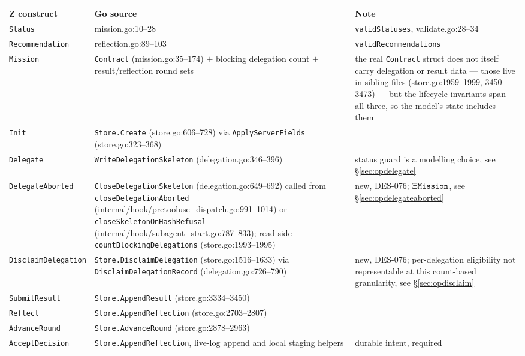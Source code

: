 \documentclass[a4paper,10pt,fleqn]{article}
\newcommand{\field}[1]{\ifmmode\texttt{#1}\else\texorpdfstring{\breakfield{#1}}{#1}\fi}
\begin{document}
\begin{longtable}{@{}>{\raggedright\arraybackslash}p{}>{\raggedright\arraybackslash}p{}>{\raggedright\arraybackslash}p{}@{}}
\toprule
\textbf{Z construct} & \textbf{Go source} & \textbf{Note} \\
\midrule
\endhead
\bottomrule
\endfoot
\field{Status} & mission.go:10--28 & \field{validStatuses},
  validate.go:28--34 \\
\field{Recommendation} & reflection.go:89--103 &
  \field{validRecommendations} \\
\field{Mission} & \field{Contract} (mission.go:35--174) $+$
  blocking delegation count $+$ result/reflection round sets & the
  real \field{Contract} struct does not itself carry delegation or
  result data --- those live in sibling files (store.go:1959--1999,
  3450--3473) --- but the lifecycle invariants span all three, so the
  model's state includes them \\
\field{Init} & \field{Store.Create}
  (store.go:606--728) via \field{ApplyServerFields}
  (store.go:323--368) & \\
\field{Delegate} & \field{WriteDelegationSkeleton}
  (delegation.go:346--396) & status guard is a modelling choice, see
  \S\ref{sec:opdelegate} \\
\field{DelegateAborted} & \field{CloseDelegationSkeleton}
  (delegation.go:649--692) called from \field{closeDelegationAborted}
  (internal/hook/pretooluse\_dispatch.go:991--1014) or
  \field{closeSkeletonOnHashRefusal}
  (internal/hook/subagent\_start.go:787--833); read side
  \field{countBlockingDelegations} (store.go:1993--1995) & new,
  DES-076; $\Xi \field{Mission}$, see \S\ref{sec:opdelegateaborted} \\
\field{DisclaimDelegation} & \field{Store.DisclaimDelegation}
  (store.go:1516--1633) via \field{DisclaimDelegationRecord}
  (delegation.go:726--790) & new, DES-076; per-delegation eligibility
  not representable at this count-based granularity, see
  \S\ref{sec:opdisclaim} \\
\field{SubmitResult} & \field{Store.AppendResult}
  (store.go:3334--3450) & \\
\field{Reflect} & \field{Store.AppendReflection}
  (store.go:2703--2807) & \\
\field{AdvanceRound} & \field{Store.AdvanceRound}
  (store.go:2878--2963) & \\
\field{AcceptDecision} & \field{Store.AppendReflection},
  live-log append and local staging helpers & durable intent, required

\end{longtable}
\end{document}
